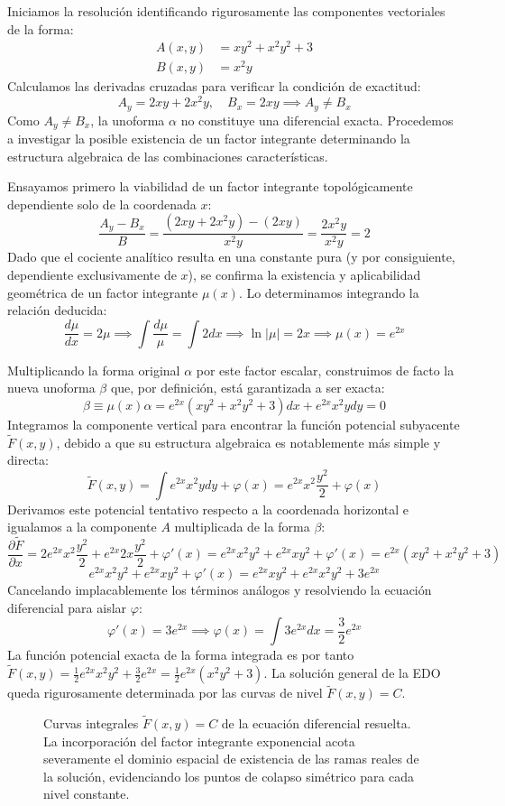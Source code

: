 \begin{tcolorbox}
Iniciamos la resolución identificando rigurosamente las componentes vectoriales de la forma:
\begin{align*}
    A(x,y) &= xy^2 + x^2y^2 + 3 \\
    B(x,y) &= x^2y 
\end{align*}
Calculamos las derivadas cruzadas para verificar la condición de exactitud:
$$ A_y = 2xy + 2x^2y, \quad B_x = 2xy \implies A_y \neq B_x $$
Como $A_y \neq B_x$, la unoforma $\alpha$ no constituye una diferencial exacta. Procedemos a investigar la posible existencia de un factor integrante determinando la estructura algebraica de las combinaciones características.

Ensayamos primero la viabilidad de un factor integrante topológicamente dependiente solo de la coordenada $x$:
$$ \frac{A_y - B_x}{B} = \frac{(2xy + 2x^2y) - (2xy)}{x^2y} = \frac{2x^2y}{x^2y} = 2 $$
Dado que el cociente analítico resulta en una constante pura (y por consiguiente, dependiente exclusivamente de $x$), se confirma la existencia y aplicabilidad geométrica de un factor integrante $\mu(x)$. Lo determinamos integrando la relación deducida:
$$ \frac{d\mu}{dx} = 2\mu \implies \int \frac{d\mu}{\mu} = \int 2 dx \implies \ln|\mu| = 2x \implies \mu(x) = e^{2x} $$

Multiplicando la forma original $\alpha$ por este factor escalar, construimos de facto la nueva unoforma $\beta$ que, por definición, está garantizada a ser exacta:
$$ \beta \equiv \mu(x)\alpha = e^{2x}(xy^2 + x^2y^2 + 3)dx + e^{2x}x^2y dy = 0 $$
Integramos la componente vertical para encontrar la función potencial subyacente $\tilde{F}(x,y)$, debido a que su estructura algebraica es notablemente más simple y directa:
$$ \tilde{F}(x,y) = \int e^{2x}x^2y dy + \varphi(x) = e^{2x}x^2 \frac{y^2}{2} + \varphi(x) $$
Derivamos este potencial tentativo respecto a la coordenada horizontal e igualamos a la componente $A$ multiplicada de la forma $\beta$:
$$ \frac{\partial \tilde{F}}{\partial x} = 2e^{2x}x^2 \frac{y^2}{2} + e^{2x}2x \frac{y^2}{2} + \varphi'(x) = e^{2x}x^2y^2 + e^{2x}xy^2 + \varphi'(x) = e^{2x}(xy^2 + x^2y^2 + 3) $$
$$ e^{2x}x^2y^2 + e^{2x}xy^2 + \varphi'(x) = e^{2x}xy^2 + e^{2x}x^2y^2 + 3e^{2x} $$
Cancelando implacablemente los términos análogos y resolviendo la ecuación diferencial para aislar $\varphi$:
$$ \varphi'(x) = 3e^{2x} \implies \varphi(x) = \int 3e^{2x} dx = \frac{3}{2}e^{2x} $$
La función potencial exacta de la forma integrada es por tanto $\tilde{F}(x,y) = \frac{1}{2}e^{2x}x^2y^2 + \frac{3}{2}e^{2x} = \frac{1}{2}e^{2x}(x^2y^2 + 3)$.
La solución general de la EDO queda rigurosamente determinada por las curvas de nivel $\tilde{F}(x,y) = C$.

\begin{figure}[H]
    \centering
    
    \caption{Curvas integrales $\tilde{F}(x,y) = C$ de la ecuación diferencial resuelta. La incorporación del factor integrante exponencial acota severamente el dominio espacial de existencia de las ramas reales de la solución, evidenciando los puntos de colapso simétrico para cada nivel constante.}
\end{figure}
\end{tcolorbox}


